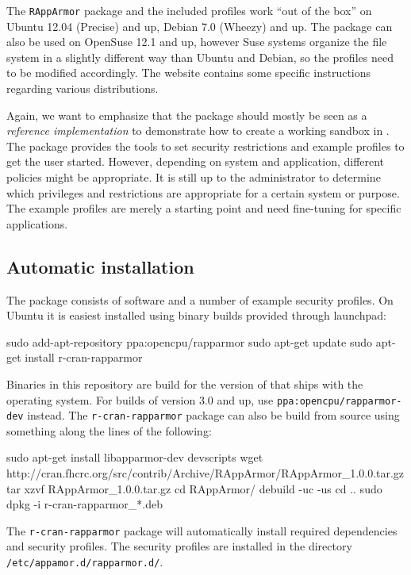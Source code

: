 The \texttt{RAppArmor} package and the included profiles work ``out of the box''
on Ubuntu 12.04 (Precise) and up, Debian 7.0 (Wheezy) and up. The package can
also be used on OpenSuse 12.1 and up, however Suse systems organize the file
system in a slightly different way than Ubuntu and Debian, so the profiles need
to be modified accordingly. The \RAppArmor website contains some specific
instructions regarding various distributions.


Again, we want to emphasize that the package should mostly be seen as a
\emph{reference implementation} to demonstrate how to create a working sandbox
in \R. The \RAppArmor package provides the tools to set security restrictions
and example profiles to get the user started. However, depending on system and
application, different policies might be appropriate. It is still up to the
administrator to determine which privileges and restrictions are appropriate
for a certain system or purpose. The example profiles are merely a starting
point and need fine-tuning for specific applications.

\subsection{Automatic installation}

The \RAppArmor package consists of \R software and a number of example security
profiles. On Ubuntu it is easiest installed using binary builds provided
through launchpad:

\begin{codeblock}
sudo add-apt-repository ppa:opencpu/rapparmor
sudo apt-get update
sudo apt-get install r-cran-rapparmor
\end{codeblock}

Binaries in this repository are build for the version of \R that ships with the
operating system. For builds of \R version 3.0 and up, use \texttt{ppa:opencpu/rapparmor-dev} 
instead. The \texttt{r-cran-rapparmor}
package can also be build from source using something along the lines of the
following:

\begin{codeblock}
sudo apt-get install libapparmor-dev devscripts
wget http://cran.fhcrc.org/src/contrib/Archive/RAppArmor/RAppArmor_1.0.0.tar.gz
tar xzvf RAppArmor_1.0.0.tar.gz
cd RAppArmor/
debuild -uc -us
cd ..
sudo dpkg -i r-cran-rapparmor_*.deb
\end{codeblock}

The \texttt{r-cran-rapparmor} package will automatically install required
dependencies and security profiles. The security profiles are installed in
the directory \texttt{/etc/appamor.d/rapparmor.d/}.

